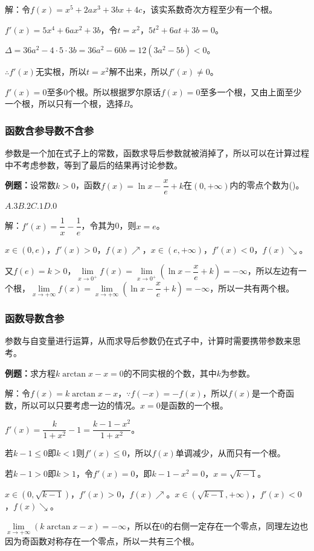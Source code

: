 \documentclass[UTF8, 12pt]{ctexart}
\begin{document}
解：令$f(x)=x^5+2ax^3+3bx+4c$，该实系数奇次方程至少有一个根。

$f'(x)=5x^4+6ax^2+3b$，令$t=x^2$，$5t^2+6at+3b=0$。

$\Delta=36a^2-4\cdot5\cdot3b=36a^2-60b=12(3a^2-5b)<0$。

$\therefore f'(x)$无实根，所以$t=x^2$解不出来，所以$f'(x)\neq0$。

$f'(x)=0$至多0个根。所以根据罗尔原话$f(x)=0$至多一个根，又由上面至少一个根，所以只有一个根，选择$B$。

\subsubsection{函数含参导数不含参}

参数是一个加在式子上的常数，函数求导后参数就被消掉了，所以可以在计算过程中不考虑参数，等到了最后的结果再讨论参数。

\textbf{例题：}设常数$k>0$，函数$f(x)=\ln x-\dfrac{x}{e}+k$在$(0,+\infty)$内的零点个数为()。

$A.3$\qquad$B.2$\qquad$C.1$\qquad$D.0$

解：$f'(x)=\dfrac{1}{x}-\dfrac{1}{e}$，令其为0，则$x=e$。

$x\in(0,e)$，$f'(x)>0$，$f(x)\nearrow$，$x\in(e,+\infty)$，$f'(x)<0$，$f(x)\searrow$。

又$f(e)=k>0$，$\lim\limits_{x\to0^+}f(x)=\lim\limits_{x\to0^+}(\ln x-\dfrac{x}{e}+k)=-\infty$，所以左边有一个根，$\lim\limits_{x\to+\infty}f(x)=\lim\limits_{x\to+\infty}(\ln x-\dfrac{x}{e}+k)=-\infty$，所以一共有两个根。

\subsubsection{函数导数含参}

参数与自变量进行运算，从而求导后参数仍在式子中，计算时需要携带参数来思考。

\textbf{例题：}求方程$k\arctan x-x=0$的不同实根的个数，其中$k$为参数。

解：令$f(x)=k\arctan x-x$$，\because f(-x)=-f(x)$，所以$f(x)$是一个奇函数，所以可以只要考虑一边的情况。$x=0$是函数的一个根。

$f'(x)=\dfrac{k}{1+x^2}-1=\dfrac{k-1-x^2}{1+x^2}$。

若$k-1\leqslant0$即$k<1$则$f'(x)\leqslant0$，所以$f(x)$单调减少，从而只有一个根。

若$k-1>0$即$k>1$，令$f'(x)=0$，即$k-1-x^2=0$，$x=\sqrt{k-1}$。

$x\in(0,\sqrt{k-1})$，$f'(x)>0$，$f(x)\nearrow$。$x\in(\sqrt{k-1},+\infty)$，$f'(x)<0$，$f(x)\searrow$。

$\lim\limits_{x\to+\infty}(k\arctan x-x)=-\infty$，所以在0的右侧一定存在一个零点，同理左边也因为奇函数对称存在一个零点，所以一共有三个根。
\end{document}
